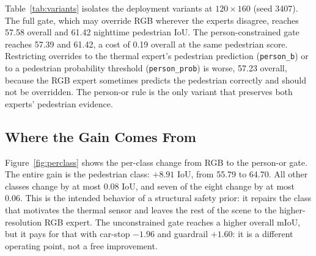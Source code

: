 Table~\ref{tab:variants} isolates the deployment variants at $120\times160$ (seed
3407). The full gate, which may override RGB wherever the experts disagree, reaches
57.58 overall and 61.42 nighttime pedestrian IoU. The person-constrained gate reaches
57.39 and 61.42, a cost of 0.19 overall at the same pedestrian score. Restricting
overrides to the thermal expert's pedestrian prediction (\texttt{person\_b}) or to a
pedestrian probability threshold (\texttt{person\_prob}) is worse, 57.23 overall,
because the RGB expert sometimes predicts the pedestrian correctly and should not be
overridden. The person-or rule is the only variant that preserves both experts'
pedestrian evidence.

\begin{table}[t]
\centering
\caption{Gate variants at $120\times160$ (seed 3407, frozen experts). A is RGB-only,
B is thermal-only; all other rows are gate deployments.}
\label{tab:variants}
\end{table}

\subsection{Where the Gain Comes From}

Figure~\ref{fig:perclass} shows the per-class change from RGB to the person-or gate.
The entire gain is the pedestrian class: $+8.91$ IoU, from 55.79 to 64.70. All other
classes change by at most 0.08 IoU, and seven of the eight change by at most 0.06. This
is the intended behavior of a structural safety prior: it repairs the class that
motivates the thermal sensor and leaves the rest of the scene to the higher-resolution
RGB expert. The unconstrained gate reaches a higher overall mIoU, but it pays for that
with car-stop $-1.96$ and guardrail $+1.60$: it is a different operating point, not a
free improvement.

